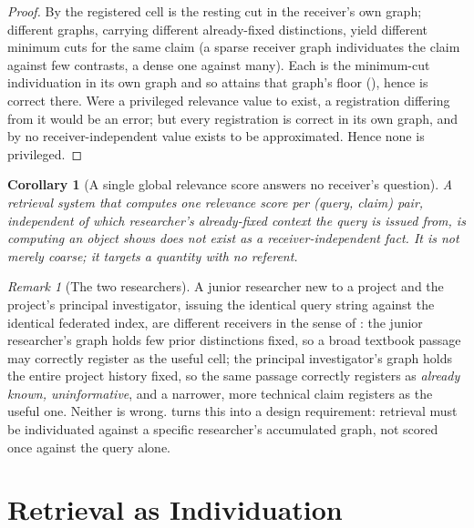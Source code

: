 \documentclass[11pt,twocolumn,a4paper]{article}
\theoremstyle{frathm}
\newtheorem{corollary}[theorem]{Corollary}
\theoremstyle{definition}
\theoremstyle{remark}
\newtheorem{remark}[theorem]{Remark}
\begin{document}
\begin{proof}
By  the registered cell is the resting cut in the
receiver's own graph; different graphs, carrying different already-fixed
distinctions, yield different minimum cuts for the same claim (a sparse
receiver graph individuates the claim against few contrasts, a dense one
against many). Each is the minimum-cut individuation in its own graph and
so attains that graph's floor (), hence is correct there.
Were a privileged relevance value to exist, a registration differing from
it would be an error; but every registration is correct in its own graph,
and by  no receiver-independent value exists to
be approximated. Hence none is privileged.
\end{proof}

\begin{corollary}[A single global relevance score answers no receiver's
question]
\label{cor:global-score-fails}
A retrieval system that computes one relevance score per (query, claim)
pair, independent of which researcher's already-fixed context the query
is issued from, is computing an object  shows does not
exist as a receiver-independent fact. It is not merely coarse; it targets
a quantity with no referent.
\end{corollary}

\begin{remark}[The two researchers]
\label{rem:two-researchers}
A junior researcher new to a project and the project's principal
investigator, issuing the identical query string against the identical
federated index, are different receivers in the sense of
: the junior researcher's graph holds few prior
distinctions fixed, so a broad textbook passage may correctly register as
the useful cell; the principal investigator's graph holds the entire
project history fixed, so the same passage correctly registers as
\emph{already known, uninformative}, and a narrower, more technical claim
registers as the useful one. Neither is wrong. 
turns this into a design requirement: retrieval must be individuated
against a specific researcher's accumulated graph, not scored once against
the query alone.
\end{remark}

\part{Retrieval as Individuation}
\end{document}
